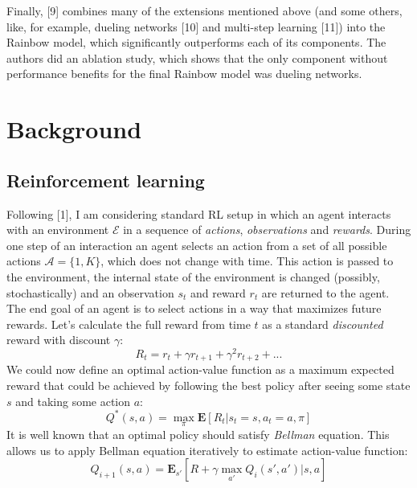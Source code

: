 \documentclass{article}
\begin{document}
     Finally, [9] combines many of the extensions mentioned above (and some others, like, for example, dueling networks [10] and multi-step learning [11]) into the Rainbow model, which significantly outperforms each of its components. The authors did an ablation study, which shows that the only component without performance benefits for the final Rainbow model was dueling networks.

\section{Background}

\subsection{Reinforcement learning}
Following [1], I am considering standard RL setup in which an agent interacts with an environment $\mathcal{E}$ in a sequence of {\it actions}, {\it observations} and {\it rewards}. During one step of an interaction an agent selects an action from a set of all possible actions $\mathcal{A}=\{1,K\}$, which does not change with time. This action is passed to the environment, the internal state of the environment is changed (possibly, stochastically) and an observation $s_t$ and reward $r_t$ are returned to the agent. The end goal of an agent is to select actions in a way that maximizes future rewards. Let's calculate the full reward from time $t$ as a standard {\it discounted} reward with discount $\gamma$:
\begin{equation}\label{eq:reward}
R_t = r_t + \gamma r_{t+1} + \gamma^2 r_{t+2} + ...
\end{equation}
We could now define an optimal action-value function as a maximum expected reward that could be achieved by following the best policy after seeing some state $s$ and taking some action $a$:
\begin{equation}\label{eq:Q}
Q^*(s,a) = \max_{\pi}\mathbf{E}[R_t|s_t=s,a_t=a,\pi]
\end{equation}
It is well known that an optimal policy should satisfy {\it Bellman} equation. This allows us to apply Bellman equation iteratively to estimate action-value function:
\begin{equation}\label{eq:Bellman}
Q_{i+1}(s,a) = \mathbf{E}_{s'}[R + \gamma \max_{a'} Q_i(s',a')|s,a]
\end{equation}
\end{document}

